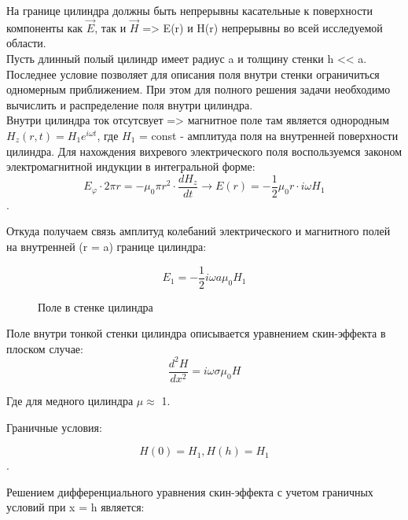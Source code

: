 \documentclass[a4paper,12pt]{article}
\begin{document}
На границе цилиндра должны быть непрерывны касательные к поверхности компоненты как $\vec{E}$, так и $\vec{H}$ => E(r) и H(r) непрерывны во всей исследуемой области. \\
Пусть длинный полый цилиндр имеет радиус a и толщину стенки h << a. Последнее условие позволяет для описания поля внутри стенки ограничиться одномерным приближением. При этом для полного решения задачи необходимо вычислить и распределение поля внутри цилиндра. \\
Внутри цилиндра ток отсутсвует => магнитное поле там является однородным $H_z(r,t) = H_1e^{i\omega t}$, где $H_1$ = const - амплитуда поля на внутренней поверхности цилиндра. Для нахождения вихревого электрического поля воспользуемся законом электромагнитной индукции в интегральной форме: 
$$E_{\varphi} \cdot 2\pi r = - {\mu}_0\pi r^2 \cdot \frac{dH_z}{dt} \rightarrow E(r) = -\frac{1}{2}{\mu}_0 r \cdot i\omega H_1$$. 

Откуда получаем связь амплитуд колебаний электрического и магнитного полей на внутренней (r = a) границе цилиндра: 

$$ E_1 = -\frac{1}{2}i\omega a{\mu}_0 H_1 $$

\begin{figure}[htp]
\caption{Поле в стенке цилиндра}
\end{figure}

Поле внутри тонкой стенки цилиндра описывается уравнением скин-эффекта в плоском случае:
$$\frac{d^2 H}{dx^2} = i\omega \sigma {\mu}_0 H$$

Где для медного цилиндра $\mu \approx$ 1. 

Граничные условия: 

$$H(0) = H_1, H(h) = H_1$$. 

Решением дифференциального уравнения скин-эффекта с учетом граничных условий при x = h является: 
\end{document}
